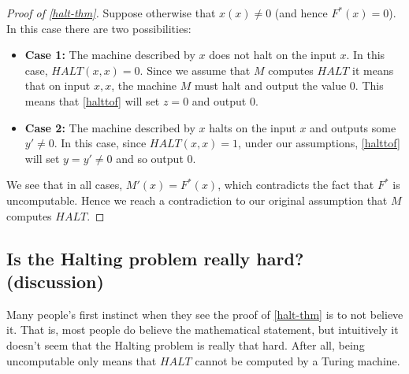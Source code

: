 \begin{proof}[Proof of \cref{halt-thm}]
Suppose otherwise that \(x(x) \neq 0\) (and hence \(F^*(x)=0\)). In this
case there are two possibilities:

\begin{itemize}
\item
  \textbf{Case 1:} The machine described by \(x\) does not halt on the
  input \(x\). In this case, \(\ensuremath{\mathit{HALT}}(x,x)=0\).
  Since we assume that \(M\) computes \(\ensuremath{\mathit{HALT}}\) it
  means that on input \(x,x\), the machine \(M\) must halt and output
  the value \(0\). This means that \cref{halttof} will set \(z=0\) and
  output \(0\).
\item
  \textbf{Case 2:} The machine described by \(x\) halts on the input
  \(x\) and outputs some \(y' \neq 0\). In this case, since
  \(\ensuremath{\mathit{HALT}}(x,x)=1\), under our assumptions,
  \cref{halttof} will set \(y=y' \neq 0\) and so output \(0\).
\end{itemize}

We see that in all cases, \(M'(x)=F^*(x)\), which contradicts the fact
that \(F^*\) is uncomputable. Hence we reach a contradiction to our
original assumption that \(M\) computes \(\ensuremath{\mathit{HALT}}\).

\end{proof}


\subsection{Is the Halting problem really hard?
(discussion)}\label{Is-the-Halting-problem-re}

Many people's first instinct when they see the proof of \cref{halt-thm}
is to not believe it. That is, most people do believe the mathematical
statement, but intuitively it doesn't seem that the Halting problem is
really that hard. After all, being uncomputable only means that
\(\ensuremath{\mathit{HALT}}\) cannot be computed by a Turing machine.

